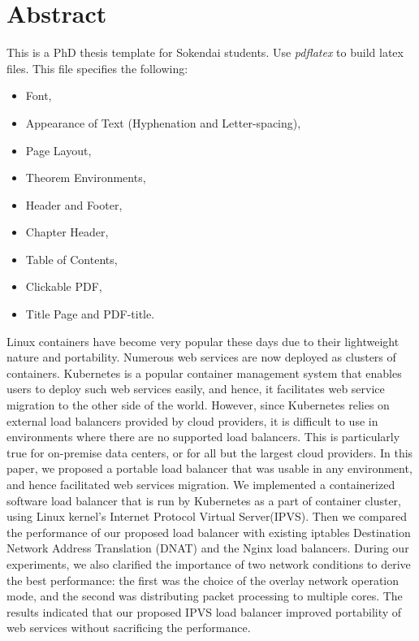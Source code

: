 \chapter*{Abstract}

This is a PhD thesis template for Sokendai students.
Use \textit{pdflatex} to build latex files.
This file specifies the following:
\begin{itemize}
	\item Font,
	\item Appearance of Text (Hyphenation and Letter-spacing),
	\item Page Layout,
	\item Theorem Environments,
	\item Header and Footer,
	\item Chapter Header,
	\item Table of Contents,
	\item Clickable PDF,
	\item Title Page and PDF-title.
\end{itemize}

Linux containers have become very popular these days due to their lightweight nature and portability. 
Numerous web services are now deployed as clusters of containers. 
Kubernetes is a popular container management system that enables users to deploy such web services easily, and hence, 
it facilitates web service migration to the other side of the world.
However, since Kubernetes relies on external load balancers provided by cloud providers, 
it is difficult to use in environments where there are no supported load balancers.
This is particularly true for on-premise data centers, or for all but the largest cloud providers.
In this paper, we proposed a portable load balancer that was usable in any environment, and hence facilitated web services migration.
We implemented a containerized software load balancer that is run by Kubernetes as a part of container cluster, 
using Linux kernel's Internet Protocol Virtual Server(IPVS).
Then we compared the performance of our proposed load balancer with existing iptables Destination Network Address 
Translation (DNAT) and the Nginx load balancers.
During our experiments, we also clarified the importance of two network conditions to derive the best performance: 
the first was the choice of the overlay network operation mode, and the second was distributing packet processing to multiple cores.
The results indicated that our proposed IPVS load balancer improved portability of web services without sacrificing the performance.


